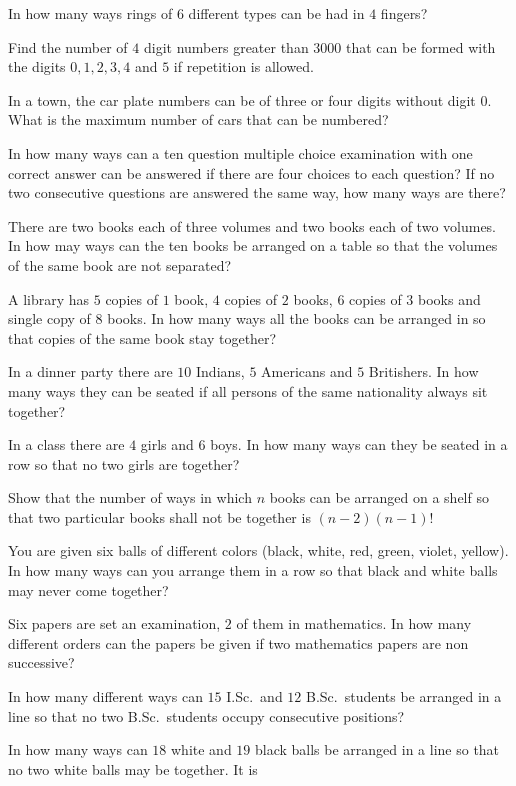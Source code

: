 \item In how many ways rings of $6$ different types can be had in $4$ fingers?
\item Find the number of $4$ digit numbers greater than $3000$ that can be formed with the digits $0, 1, 2, 3, 4$ and $5$ if
  repetition is allowed.
\item In a town, the car plate numbers can be of three or four digits without digit $0$. What is the maximum number of cars that
  can be numbered?
\item In how many ways can a ten question multiple choice examination with one correct answer can be answered if there are four
  choices to each question? If no two consecutive questions are answered the same way, how many ways are there?
\item There are two books each of three volumes and two books each of two volumes. In how may ways can the ten books be arranged on
  a table so that the volumes of the same book are not separated?
\item A library has $5$ copies of $1$ book, $4$ copies of $2$ books, $6$ copies of $3$ books and single copy of $8$ books. In how
  many ways all the books can be arranged in so that copies of the same book stay together?
\item In a dinner party there are $10$ Indians, $5$ Americans and $5$ Britishers. In how many ways they can be seated if all persons
  of the same nationality always sit together?
\item In a class there are $4$ girls and $6$ boys. In how many ways can they be seated in a row so that no two girls are together?
\item Show that the number of ways in which $n$ books can be arranged on a shelf so that two particular books shall not be
  together is $(n - 2)(n - 1)!$
\item You are given six balls of different colors (black, white, red, green, violet, yellow). In how many ways can you arrange them
  in a row so that black and white balls may never come together?
\item Six papers are set an examination, $2$ of them in mathematics. In how many different orders can the papers be given if two
  mathematics papers are non successive?
\item In how many different ways can $15$ I.Sc.\ and $12$ B.Sc.\ students be arranged in a line so that no two B.Sc.\ students occupy
  consecutive positions?
\item In how many ways can $18$ white and $19$ black balls be arranged in a line so that no two white balls may be together. It is

